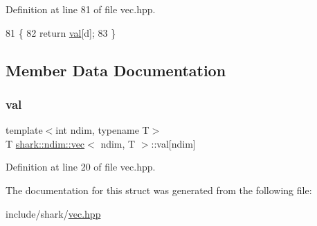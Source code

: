 Definition at line 81 of file vec.\+hpp.


\begin{DoxyCode}
81                                                            \{
82             \textcolor{keywordflow}{return} \hyperlink{structshark_1_1ndim_1_1vec_a1769eccc65b4b95dced51726c271d077}{val}[d];
83         \}
\end{DoxyCode}


\subsection{Member Data Documentation}
\hypertarget{structshark_1_1ndim_1_1vec_a1769eccc65b4b95dced51726c271d077}{}\label{structshark_1_1ndim_1_1vec_a1769eccc65b4b95dced51726c271d077} 
\subsubsection{\texorpdfstring{val}{val}}
{\footnotesize\ttfamily template$<$int ndim, typename T$>$ \\
T \hyperlink{structshark_1_1ndim_1_1vec}{shark\+::ndim\+::vec}$<$ ndim, T $>$\+::val\mbox{[}ndim\mbox{]}}



Definition at line 20 of file vec.\+hpp.



The documentation for this struct was generated from the following file\+:\begin{DoxyCompactItemize}
\item 
include/shark/\hyperlink{vec_8hpp}{vec.\+hpp}\end{DoxyCompactItemize}
